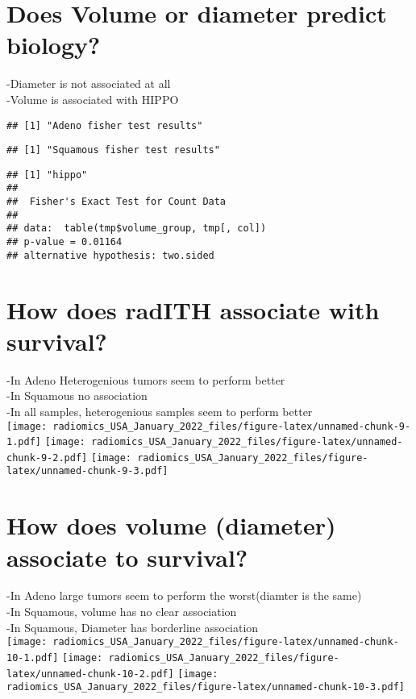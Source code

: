 \documentclass[]{article}
\begin{document}
\section{Does Volume or diameter predict
biology?}\label{does-volume-or-diameter-predict-biology}

-Diameter is not associated at all\\
-Volume is associated with HIPPO\\

\begin{verbatim}
## [1] "Adeno fisher test results"
\end{verbatim}

\begin{verbatim}
## [1] "Squamous fisher test results"
\end{verbatim}

\begin{verbatim}
## [1] "hippo"
## 
##  Fisher's Exact Test for Count Data
## 
## data:  table(tmp$volume_group, tmp[, col])
## p-value = 0.01164
## alternative hypothesis: two.sided
\end{verbatim}

\section{How does radITH associate with
survival?}\label{how-does-radith-associate-with-survival}

-In Adeno Heterogenious tumors seem to perform better\\
-In Squamous no association\\
-In all samples, heterogenious samples seem to perform better\\
\texttt{[image: radiomics\_USA\_January\_2022\_files/figure-latex/unnamed-chunk-9-1.pdf]}
\texttt{[image: radiomics\_USA\_January\_2022\_files/figure-latex/unnamed-chunk-9-2.pdf]}
\texttt{[image: radiomics\_USA\_January\_2022\_files/figure-latex/unnamed-chunk-9-3.pdf]}

\section{How does volume (diameter) associate to
survival?}\label{how-does-volume-diameter-associate-to-survival}

-In Adeno large tumors seem to perform the worst(diamter is the same)\\
-In Squamous, volume has no clear association\\
-In Squamous, Diameter has borderline association\\
\texttt{[image: radiomics\_USA\_January\_2022\_files/figure-latex/unnamed-chunk-10-1.pdf]}
\texttt{[image: radiomics\_USA\_January\_2022\_files/figure-latex/unnamed-chunk-10-2.pdf]}
\texttt{[image: radiomics\_USA\_January\_2022\_files/figure-latex/unnamed-chunk-10-3.pdf]}
\end{document}
